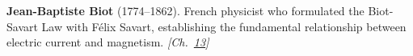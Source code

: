\textbf{Jean-Baptiste Biot} (1774–1862). French physicist who formulated the Biot-Savart Law with F\'{e}lix Savart, establishing the fundamental relationship between electric current and magnetism. \emph{[Ch.~\hyperref[ch:poissonsspot]{13}]}

